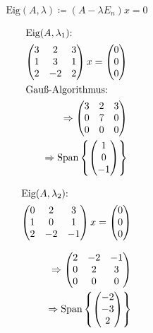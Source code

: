 \documentclass{HM}
\newcommand{\Eig}{\text{Eig}}
\newcommand{\Span}{\text{Span}}
\begin{document}
\begin{enumerate}
	$$\Eig(A,\lambda)\coloneqq (A-\lambda E_n)x=0$$
	\begin{minipage}{.33\textwidth}
		\begin{align*}
		\intertext{$\Eig(A, \lambda_1)$:}
		\begin{pmatrix}
			3&2&3\\
			1&3&1\\
			2&-2&2
		\end{pmatrix}x=\begin{pmatrix}
			0\\0\\0
		\end{pmatrix}\\
		\intertext{Gauß-Algorithmus:}
		\Rightarrow\begin{pmatrix}
			3&2&3\\
			0&7&0\\
			0&0&0
		\end{pmatrix}\\
		\Rightarrow\Span\left\lbrace\begin{pmatrix}
			1\\
			0\\
			-1
		\end{pmatrix}\right\rbrace
		\end{align*}
	\end{minipage}
	\begin{minipage}{.33\textwidth}
		\begin{align*}
		\intertext{$\Eig(A, \lambda_2)$:}
		\begin{pmatrix}
			0&2&3\\
			1&0&1\\
			2&-2&-1
		\end{pmatrix}x=\begin{pmatrix}
			0\\0\\0
		\end{pmatrix}\\
		\intertext{}
		\Rightarrow\begin{pmatrix}
			2&-2&-1\\
			0&2&3\\
			0&0&0
		\end{pmatrix}\\
		\Rightarrow\Span\left\lbrace\begin{pmatrix}
			-2\\
			-3\\
			2
		\end{pmatrix}\right\rbrace
		\end{align*}

\end{minipage}
\end{enumerate}
\end{document}
